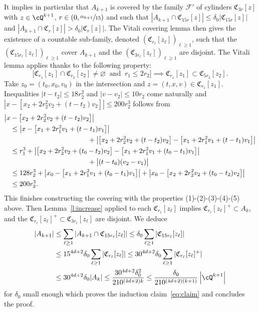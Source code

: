 It implies in particular that $A_{k+1}$ is covered by the family
$\mathcal F'$ of cylinders $\mathfrak C_{3r}[z]$ with $z \in \cQ^{k+1}$,
$r \in (0,\sfrac{\alpha_{k+1}}{15})$ and such that
$|A_{k+1} \cap \mathfrak C_{15r}[z]| \le \delta_0 |\mathfrak C_{15
r}[z]|$ and
$|A_{k+1} \cap \mathfrak C_{r}[z]| > \delta_0 |\mathfrak
C_{r}[z]|$. The Vitali covering lemma then gives the existence of
a countable sub-family, denoted
$(\mathfrak C_{r_\ell}[z_\ell])_{\ell \ge 1}$, such that the
$(\mathfrak C_{15 r_\ell}[z_\ell])_{\ell \ge 1}$ cover $A_{k+1}$
and the $(\mathfrak C_{3 r_\ell}[z_\ell])_{\ell \ge 1}$ are
disjoint. The Vitali lemma applies thanks to the following
property:
\begin{equation*}
\Big[ \mathfrak C_{r_1}[z_1] \cap \mathfrak C_{r_2}[z_2] \neq
\varnothing \ \mbox{ and } \ r_1\le 2r_2 \Big] \implies \mathfrak C_{r_1}[z_1] \subset
\mathfrak C_{5r_2}[z_2].
\end{equation*}
Take $z_0=(t_0,x_0,v_0)$ in the intersection and
$z=(t,x,v)\in \mathfrak C_{r_1}[z_1]$. Inequalities
$|t-t_2|\leq 18 r_2^2$ and $|v-v_2|\leq 10r_2$ come naturally and
$|x-[x_2+2 r_2^2v_2 +(t-t_2)v_2]| \le 200r_2^3$ follows from
\begin{align*}
\big| x&- \big[ x_2+ 2r_2^2v_2 + (t-t_2)v_2 \big] \big| \\
&\le \big| x- \big[ x_1+ 2r_1^2v_1 + (t-t_1)v_1 \big] \big|\\
&\hspace*{4cm} +
\big| \big[ x_2+ 2r_2^2v_2 + (t-t_2)v_2 \big] - \big[ x_1+
2r_1^2v_1 + (t-t_1)v_1 \big] \big| \\
& \le r_1^3 + \big| \big[ x_2+ 2r_2^2v_2 + (t_0-t_2)v_2 \big] -
\big[ x_1+ 2r_1^2v_1 + (t_0-t_1)v_1 \big] \big|\\
&\hspace*{4cm} + \big|
(t-t_0)(v_2-v_1) \big| \\
& \le 128 r_2^3 + \big| x_0- \big[ x_1+ 2r_1^2v_1 +
(t_0-t_1)v_1 \big] \big| + \big| x_0- \big[ x_2+ 2r_2^2v_2 +
(t_0-t_2)v_2 \big] \big|\\
&\le 200 r_2^3.
\end{align*}
This finishes constructing the covering with the properties
(1)-(2)-(3)-(4)-(5) above. Then Lemma~\ref{l:increase} applied to
each $\mathfrak C_{r_\ell}[z_\ell]$ implies
$\mathfrak C_{r_\ell}[z_\ell]^+ \subset A_k$, and the
$\mathfrak C_{r_\ell}[z_\ell]^+ \subset \mathfrak C_{3
r_\ell}[z_\ell]$ are disjoint. We deduce
\begin{align*}
|A_{k+1}|
& \le \sum_{\ell \ge 1} |A_{k+1} \cap \mathfrak C_{15
r_\ell}[z_\ell]| \le \delta_0 \sum_{\ell \ge 1}
|\mathfrak C_{15 r_\ell}[z_\ell]| \\
& \le 15^{4d+2} \delta_0 \sum_{\ell \ge 1} |\mathfrak
C_{r_\ell}[z_\ell]| \le 30^{4d+2} \delta_0 \sum_{\ell \ge 1}
|\mathfrak C_{r_\ell}[z_\ell]^+| \\
& \le 30^{4d+2} \delta_0 |A_k|
\le \frac{30^{4d+2}\delta_0^2}{210^{(4d+2)k}}
\le \frac{\delta_0}{210^{(4d+2)(k+1)}} \left| \cQ^{k+1}
\right|
\end{align*}
for $\delta_0$ small enough which proves the induction
claim~\eqref{eq:claim} and concludes the proof.

